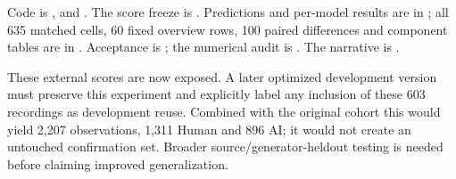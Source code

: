 Code is ,
 and
. The score freeze is
.
Predictions and per-model results are in
; all 635 matched cells,
60 fixed overview rows, 100 paired differences and component tables are in
. Acceptance is
; the numerical
audit is .
The narrative is .

These external scores are now exposed. A later optimized development version
must preserve this experiment and explicitly label any inclusion of these
603 recordings as development reuse. Combined with the original cohort this
would yield 2,207 observations, 1,311 Human and 896 AI; it would not create an
untouched confirmation set. Broader source/generator-heldout testing is needed
before claiming improved generalization.
